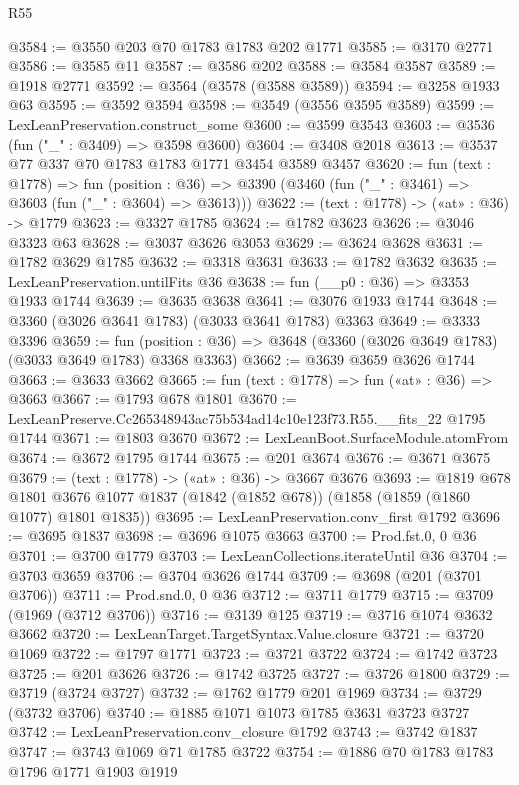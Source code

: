 \begin{lexlean}{R55}
\begin{coremodule}
@3584 := @3550 @203 @70 @1783 @1783 @202 @1771
@3585 := @3170 @2771
@3586 := @3585 @11
@3587 := @3586 @202
@3588 := @3584 @3587
@3589 := @1918 @2771
@3592 := @3564 (@3578 (@3588 @3589))
@3594 := @3258 @1933 @63
@3595 := @3592 @3594
@3598 := @3549 (@3556 @3595 @3589)
@3599 := LexLeanPreservation.construct_some
@3600 := @3599 @3543
@3603 := @3536 (fun ("_" : @3409) => @3598 @3600)
@3604 := @3408 @2018
@3613 := @3537 @77 @337 @70 @1783 @1783 @1771 @3454 @3589 @3457
@3620 := fun (text : @1778) =>
  fun (position : @36) => @3390 (@3460 (fun ("_" : @3461) => @3603 (fun ("_" : @3604) => @3613)))
@3622 := (text : @1778) -> («at» : @36) -> @1779
@3623 := @3327 @1785
@3624 := @1782 @3623
@3626 := @3046 @3323 @63
@3628 := @3037 @3626 @3053
@3629 := @3624 @3628
@3631 := @1782 @3629 @1785
@3632 := @3318 @3631
@3633 := @1782 @3632
@3635 := LexLeanPreservation.untilFits @36
@3638 := fun (__p0 : @36) => @3353 @1933 @1744
@3639 := @3635 @3638
@3641 := @3076 @1933 @1744
@3648 := @3360 (@3026 @3641 @1783) (@3033 @3641 @1783) @3363
@3649 := @3333 @3396
@3659 := fun (position : @36) => @3648 (@3360 (@3026 @3649 @1783) (@3033 @3649 @1783) @3368 @3363)
@3662 := @3639 @3659 @3626 @1744
@3663 := @3633 @3662
@3665 := fun (text : @1778) => fun («at» : @36) => @3663
@3667 := @1793 @678 @1801
@3670 := LexLeanPreserve.Cc265348943ac75b534ad14c10e123f73.R55.__fits_22 @1795 @1744
@3671 := @1803 @3670
@3672 := LexLeanBoot.SurfaceModule.atomFrom
@3674 := @3672 @1795 @1744
@3675 := @201 @3674
@3676 := @3671 @3675
@3679 := (text : @1778) -> («at» : @36) -> @3667 @3676
@3693 := @1819
    @678
    @1801
    @3676
    @1077
    @1837
    (@1842 (@1852 @678))
    (@1858 (@1859 (@1860 @1077) @1801 @1835))
@3695 := LexLeanPreservation.conv_first @1792
@3696 := @3695 @1837
@3698 := @3696 @1075 @3663
@3700 := Prod.fst.{0, 0} @36
@3701 := @3700 @1779
@3703 := LexLeanCollections.iterateUntil @36
@3704 := @3703 @3659
@3706 := @3704 @3626 @1744
@3709 := @3698 (@201 (@3701 @3706))
@3711 := Prod.snd.{0, 0} @36
@3712 := @3711 @1779
@3715 := @3709 (@1969 (@3712 @3706))
@3716 := @3139 @125
@3719 := @3716 @1074 @3632 @3662
@3720 := LexLeanTarget.TargetSyntax.Value.closure
@3721 := @3720 @1069
@3722 := @1797 @1771
@3723 := @3721 @3722
@3724 := @1742 @3723
@3725 := @201 @3626
@3726 := @1742 @3725
@3727 := @3726 @1800
@3729 := @3719 (@3724 @3727)
@3732 := @1762 @1779 @201 @1969
@3734 := @3729 (@3732 @3706)
@3740 := @1885 @1071 @1073 @1785 @3631 @3723 @3727
@3742 := LexLeanPreservation.conv_closure @1792
@3743 := @3742 @1837
@3747 := @3743 @1069 @71 @1785 @3722
@3754 := @1886 @70 @1783 @1783 @1796 @1771 @1903 @1919

\end{coremodule}
\end{lexlean}
